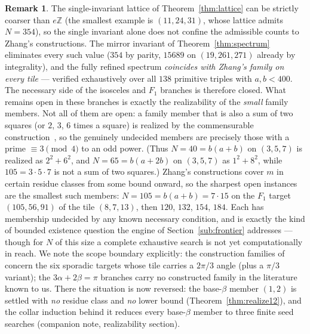 \documentclass[11pt,reqno]{amsart}
\theoremstyle{plain}
\theoremstyle{definition}
\newtheorem{remark}[theorem]{Remark}
\newcommand{\Z}{\mathbb{Z}}
\begin{document}
\begin{remark}\label{rem:zhang}
The single-invariant lattice of Theorem~\ref{thm:lattice} can be strictly coarser than $e\Z$
(the smallest example is $(11,24,31)$, whose lattice admits $N=354$), so the single invariant alone
does not confine the admissible counts to Zhang's constructions. The
mirror invariant of Theorem~\ref{thm:spectrum} eliminates every such value ($354$ by parity, $15689$ on $(19,261,271)$ already
by integrality), and the fully refined spectrum \emph{coincides with Zhang's family on every
tile} --- verified exhaustively over all $138$ primitive triples with $a,b<400$. The necessary
side of the isosceles and $F_1$ branches is therefore closed. What remains open in these branches
is exactly the realizability of the \emph{small} family members. Not all of them are open:
a family member that is also a sum of two squares (or $2$, $3$, $6$ times a square) is realized by
the commensurable construction~\cite{BeesonSeven}, so the genuinely undecided members are precisely
those with a prime $\equiv3\pmod4$ to an odd power. (Thus $N=40=b(a+b)$ on $(3,5,7)$ is realized
as $2^2+6^2$, and $N=65=b(a+2b)$ on $(3,5,7)$ as $1^2+8^2$, while $105=3\cdot5\cdot7$ is not a sum
of two squares.) Zhang's constructions cover $m$ in certain residue classes from some bound onward,
so the sharpest open instances are the smallest such members: $N=105=b(a+b)=7\cdot15$ on the
$F_1$ target $(105,56,91)$ of the tile $(8,7,13)$, then $120$, $132$, $154$, $184$. Each has
membership undecided by any known necessary condition, and is exactly the kind of bounded
existence question the engine of Section~\ref{sub:frontier} addresses --- though for $N$ of this
size a complete exhaustive search is not yet computationally in reach. We note the scope boundary
explicitly: the construction families of \cite{Zhang} concern the six sporadic targets whose tile
carries a $2\pi/3$ angle (plus a $\pi/3$ variant); the $3\alpha+2\beta=\pi$ branches carry no
constructed family in the literature known to us. There the situation is now reversed: the
base-$\beta$ member $(1,2)$ is settled with \emph{no} residue class and \emph{no} lower bound
(Theorem~\ref{thm:realize12}), and the collar induction behind it reduces every base-$\beta$
member to three finite seed searches (companion note, realizability section).
\end{remark}
\end{document}
